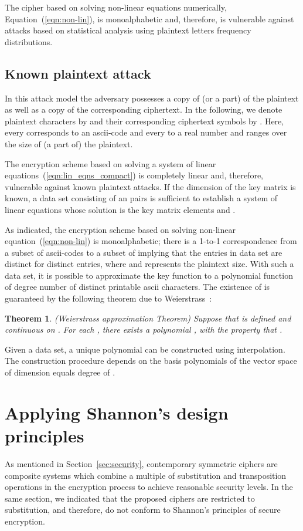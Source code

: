 \documentclass[10pt,journal]{IEEEtran}
\newtheorem{theorem}{Theorem}[]
\begin{document}
The cipher based on solving non-linear equations numerically,
Equation~(\ref{eqn:non-lin}), is monoalphabetic and, therefore, 
is vulnerable against attacks based on statistical 
analysis using plaintext letters frequency distributions.

\subsection{Known plaintext attack}
In this attack model the adversary possesses a copy of (or a part) of
the plaintext as well as a copy of the corresponding ciphertext. In
the following, we denote plaintext characters by  and their
corresponding ciphertext symbols by .  Here, every 
corresponds to an ascii-code and every  to a real number and
 ranges over the size  of (a part of) the plaintext.
\newline

The encryption scheme based on solving a system of linear
equations~(\ref{eqn:lin_eqns_compact}) is completely linear and,
therefore, vulnerable against known plaintext attacks. If the
dimension  of the key matrix  is known, a data set
consisting of an   pairs is sufficient to
establish a system of linear equations whose solution is the key
matrix elements  and .
\newline

As indicated, the encryption scheme based on solving non-linear
equation~(\ref{eqn:non-lin}) is monoalphabetic; there is a 1-to-1 
correspondence from a subset of ascii-codes to a subset of 
 implying that the  entries in data set 
 are distinct for distinct  entries, 
where  and  represents the plaintext size.
With such a data set, it is possible to approximate the key function 
 to a polynomial function  of degree  number  of 
distinct printable ascii characters. The existence of  is 
guaranteed by the following theorem due to Weierstrass~\cite{burden}:

\begin{theorem}
\emph{(Weierstrass approximation Theorem)}
\label{Weierstrass}
Suppose that  is defined and continuous on . For 
each , there exists a polynomial , with the 
property that .
\end{theorem}

Given a data set, a unique polynomial  can be constructed using
interpolation. The construction procedure depends on the basis
polynomials of the vector space of dimension equals degree of .

\section{Applying Shannon's design principles} \label{sec:prod}
As mentioned in Section~\ref{sec:security}, contemporary symmetric 
ciphers are composite systems which combine a multiple of substitution 
and transposition operations in the encryption process to achieve reasonable
security levels. In the same section, we indicated that the proposed 
ciphers are restricted to substitution, and therefore, do not conform to 
Shannon's principles of secure  encryption. 
\newline
\end{document}
